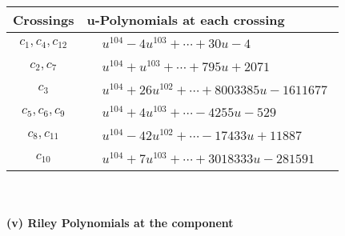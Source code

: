 \documentclass[1p]{elsarticle_modified}
\theoremstyle{definition}
\begin{document}
\begin{tabular}{m{50pt}|m{274pt}}
Crossings & \hspace{64pt}u-Polynomials at each crossing \\
\hline $$\begin{aligned}c_{1},c_{4},c_{12}\end{aligned}$$&$\begin{aligned}
&u^{104}-4 u^{103}+\cdots+30 u-4
\end{aligned}$\\
\hline $$\begin{aligned}c_{2},c_{7}\end{aligned}$$&$\begin{aligned}
&u^{104}+u^{103}+\cdots+795 u+2071
\end{aligned}$\\
\hline $$\begin{aligned}c_{3}\end{aligned}$$&$\begin{aligned}
&u^{104}+26 u^{102}+\cdots+8003385 u-1611677
\end{aligned}$\\
\hline $$\begin{aligned}c_{5},c_{6},c_{9}\end{aligned}$$&$\begin{aligned}
&u^{104}+4 u^{103}+\cdots-4255 u-529
\end{aligned}$\\
\hline $$\begin{aligned}c_{8},c_{11}\end{aligned}$$&$\begin{aligned}
&u^{104}-42 u^{102}+\cdots-17433 u+11887
\end{aligned}$\\
\hline $$\begin{aligned}c_{10}\end{aligned}$$&$\begin{aligned}
&u^{104}+7 u^{103}+\cdots+3018333 u-281591
\end{aligned}$\\
\hline
\end{tabular}\\~\\
\newpage\renewcommand{\arraystretch}{1}
\flushleft \textbf{(v) Riley Polynomials at the component}\newline \\
\end{document}

